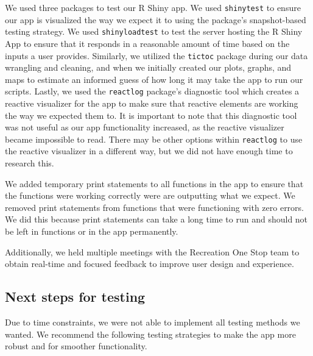 \documentclass[
]{book}
\begin{document}
We used three packages to test our R Shiny app. We used \texttt{shinytest} \citep{R-shinytest} to ensure our app is visualized the way we expect it to using the package's snapshot-based testing strategy. We used \texttt{shinyloadtest} \citep{R-shinyloadtest} to test the server hosting the R Shiny App to ensure that it responds in a reasonable amount of time based on the inputs a user provides. Similarly, we utilized the \texttt{tictoc} \citep{R-tictoc} package during our data wrangling and cleaning, and when we initially created our plots, graphs, and maps to estimate an informed guess of how long it may take the app to run our scripts. Lastly, we used the \texttt{reactlog} \citep{R-reactlog} package's diagnostic tool which creates a reactive visualizer for the app to make sure that reactive elements are working the way we expected them to. It is important to note that this diagnostic tool was not useful as our app functionality increased, as the reactive visualizer became impossible to read. There may be other options within \texttt{reactlog} to use the reactive visualizer in a different way, but we did not have enough time to research this.

We added temporary print statements to all functions in the app to ensure that the functions were working correctly were are outputting what we expect. We removed print statements from functions that were functioning with zero errors. We did this because print statements can take a long time to run and should not be left in functions or in the app permanently.

Additionally, we held multiple meetings with the Recreation One Stop team to obtain real-time and focused feedback to improve user design and experience.

\hypertarget{next-steps-for-testing}{%
\subsection{Next steps for testing}\label{next-steps-for-testing}}

Due to time constraints, we were not able to implement all testing methods we wanted. We recommend the following testing strategies to make the app more robust and for smoother functionality.
\end{document}
